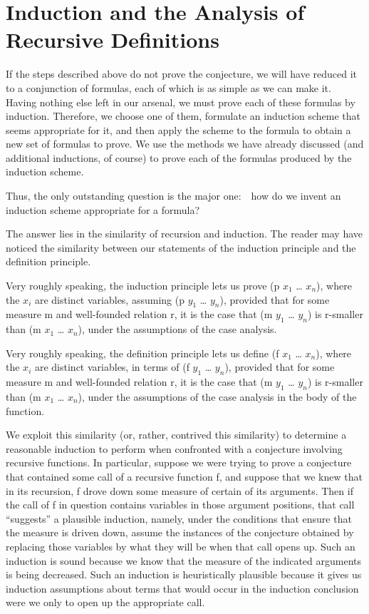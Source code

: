 \documentclass[10pt]{book}
\begin{document}
\chapter{Induction and the Analysis of Recursive Definitions}
\pagestyle{headings}
\label{SECRECURSION}
If the steps described above do not prove the conjecture, we will
have reduced it to a conjunction of formulas, each of which
is as simple as we can make it.  Having nothing else left in our arsenal,
we must prove each of these formulas by induction.  Therefore, we
choose one of them, formulate an induction scheme that seems
appropriate for it, and then apply the scheme to the formula
to obtain a new set of formulas to prove.  We use the
methods we have already discussed (and additional inductions, of
course) to prove each of the formulas produced by the induction
scheme.

Thus, the only outstanding question is the major one:~~how do
we invent an induction scheme appropriate for a formula?

The answer lies in the similarity of  recursion and induction.
The reader may have noticed the similarity between our statements
of the induction principle and the definition principle.

Very roughly speaking,
the induction principle lets us
prove (p $x_{1}$ \ldots{} $x_{n}$), where the $x_{i}$ are distinct variables,
assuming (p $y_{1}$ \ldots{} $y_{n}$), provided that for some
measure m and well-founded relation r, it is the case that
(m $y_{1}$ \ldots{} $y_{n}$) is r-smaller than (m $x_{1}$ \ldots{} $x_{n}$), under the assumptions
of the case analysis.

Very roughly speaking,
the definition principle lets us define
(f $x_{1}$ \ldots{} $x_{n}$), where the $x_{i}$ are distinct variables,
in terms of (f $y_{1}$ \ldots{} $y_{n}$), provided that for some
measure m and well-founded relation r, it is the case that
(m $y_{1}$ \ldots{} $y_{n}$) is r-smaller than (m $x_{1}$ \ldots{} $x_{n}$), under the assumptions
of the case analysis in the body of the function.

We
exploit this similarity (or, rather, contrived this similarity)
to determine a reasonable induction to
perform when confronted with a conjecture involving recursive functions.
In particular, suppose we were trying to prove a conjecture that
contained some call of a recursive function f, and suppose that we
knew that in its recursion, f drove down some measure of certain
of its arguments.  Then if the call of f in question contains
variables in those argument positions, that call ``suggests'' a plausible
induction,  namely, under the conditions that ensure that the measure
is driven down, assume the instances of the conjecture obtained by replacing
those variables by
what they will be when that call opens up.  Such an induction is sound because we know
that the measure of the indicated arguments is being decreased.
Such an induction is heuristically plausible because it gives us  induction assumptions
about terms that would occur in the induction conclusion
were we only to open up the appropriate call.
\end{document}
